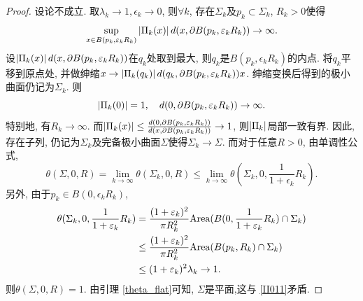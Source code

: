 \begin{proof}
    设论不成立. 取$\lambda_k \to 1, \epsilon_k \to 0$, 则$\forall k$, 存在$\Sigma_k$及$p_k \subset \Sigma_k$, $R_k >0$使得
    \begin{equation}
        \mathop{\sup}_{x \in B(p_k,\varepsilon_k R_k)}\left | {\Pi}_k(x) \right | d(x, {\partial} B(p_k,\varepsilon_k R_k)) \to \infty.
    \end{equation}
    设$\left | {\Pi}_k(x) \right |d(x, {\partial} B(p_k,\varepsilon_k R_k))$在$q_k$处取到最大, 则$q_k$是$B(p_k, \epsilon_k R_k)$的内点. 将$q_k$平移到原点处, 并做绅缩$x \to \left | {\Pi}_k(q_k) \right |d(q_k,{\partial} B(p_k, \varepsilon_k R_k))x$. 绅缩变换后得到的极小曲面仍记为$\Sigma_k$. 则
    \begin{equation}
        \left | {\Pi}_k(0) \right |=1,{\quad} d(0, {\partial} B(p_k, \varepsilon_k R_k)) \to \infty.
    \end{equation}
    特别地, 有$R_k \to \infty$.  而$\left | {\Pi}_k(x) \right | \le \frac{d(0, {\partial} B(p_k, \varepsilon_k R_k))}{d(x, {\partial} B(p_k, \varepsilon_k R_k))} \to 1$, 则$\left | {\Pi}_k \right |$局部一致有界. 因此, 存在子列, 仍记为$\Sigma_k$及完备极小曲面$\Sigma$使得$\Sigma_k \to \Sigma$. 而对于任意$R>0$, 由单调性公式,
    \begin{equation}\label{II011}
        \theta(\Sigma,0, R)= \lim_{k \to \infty} \theta(\Sigma_k,0,R) \le \lim_{k\to \infty} \theta(\Sigma_k,0,\frac{1}{1+\epsilon_k}R_k).
    \end{equation}
    另外, 由于$p_k \in B(0, \epsilon_k R_k)$,
    \begin{equation}
        \begin{split}
            \theta(\Sigma_k,0,\frac{1}{1+\varepsilon_k}R_k) &=\frac{(1+\varepsilon_k)^2}{\pi R_k^2}\text{Area}(B(0,\frac{1}{1+\varepsilon_k}R_k)\cap \Sigma_k) \\
            &\le \frac{(1+\varepsilon_k)^2}{\pi R_k^2}\text{Area}(B(p_k,R_k)\cap \Sigma_k) \\
            &\le (1+\varepsilon_k)^2\lambda_k \to 1.
        \end{split}
    \end{equation}
    则$\theta(\Sigma,0, R) =1$. 由引理 \eqref{theta_flat}可知, $\Sigma$是平面,这与 \eqref{II011}矛盾.
\end{proof}
